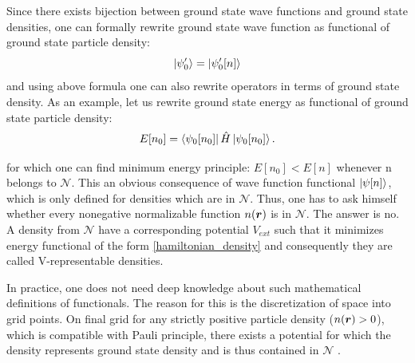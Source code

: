 \documentclass[openany, longbibliography,slovene,a4paper,12pt]{article}
\def\vec#1{\mbox{\boldmath$#1$}}
\begin{document}
Since there exists bijection between ground state wave functions and ground
state densities, one can formally rewrite ground state wave function as functional of ground
state particle density:
\begin{equation}
  \ket{\psi'_0} =  \ket{\psi'_0[n]}
  \end{equation}
and using above formula one can also rewrite operators in terms of ground state
density. As an example, let us rewrite ground state energy as functional of
ground state particle density:
\begin{equation} \label{hamiltonian_density}
  E[n_0] = \bra{\psi_0[n_0]}\hat H \ket{\psi_0[n_0]}.
  \end{equation}

for which one can find minimum energy principle: $E[n_0]<E[n]$ whenever n
belongs to $\mathcal N$. This an obvious consequence of wave function functional
$\ket{\psi [n]}$, which is only defined for densities which are in $\mathcal N$.
Thus, one has to ask himself whether every nonegative normalizable function
$n(\vec r)$ is in $\mathcal N$.  The answer is no. A density from $\mathcal N$
have a corresponding potential $V_{ext}$ such that it minimizes energy functional
of the form \ref{hamiltonian_density} and consequently they are called V-representable densities. 

In practice, one does not need deep knowledge about such mathematical
definitions of functionals. The reason for this is the discretization of space into
grid points. On final grid for any strictly positive particle density ($n(\vec r) > 0$),
which is compatible with Pauli principle, there exists a  potential for which the
density represents ground state density and is thus contained in $\mathcal N$ \cite{advanced_course}.
\end{document}
